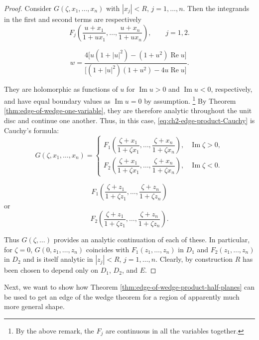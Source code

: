 \begin{proof}
Consider $G(\zeta,x_1,\ldots,x_n)$ with $|x_j|<R$, $j=1,\ldots,n$.
Then the integrands in the first and second terms are respectively
\begin{equation}
  F_j\!\left(\frac{u+x_1}{1+ux_1},\ldots,
              \frac{u+x_n}{1+ux_n}\right),
  \qquad j=1,2.
  \tag{2-102}\label{eq:ch2-edge-product-integrands}
\end{equation}

\[
  w=\frac{4\bigl[u(1+|u|^2)-(1+u^2)\operatorname{Re}u\bigr]}
          {\bigl[(1+|u|^2)(1+u^2)-4u\operatorname{Re}u\bigr]}.
\]



They are holomorphic as functions of $u$ for $\operatorname{Im}u>0$ and
$\operatorname{Im}u<0$, respectively, and have equal boundary values as
$\operatorname{Im}u=0$ by assumption.\begingroup
\renewcommand{\thefootnote}{\ensuremath{\dagger}}
\footnote{By the above remark, the $F_j$ are continuous in all the
variables together.}
\endgroup
By Theorem \ref{thm:edge-of-wedge-one-variable}, they
are therefore analytic throughout the unit disc and continue one another.
Thus, in this case, \eqref{eq:ch2-edge-product-Cauchy} is Cauchy's formula:
\begin{equation}
  G(\zeta,x_1,\ldots,x_n)=
  \begin{cases}
    F_1\!\left(\dfrac{\zeta+x_1}{1+\zeta x_1},\ldots,
                \dfrac{\zeta+x_n}{1+\zeta x_n}\right),
      &\operatorname{Im}\zeta>0,\\[12pt]
    F_2\!\left(\dfrac{\zeta+x_1}{1+\zeta x_1},\ldots,
                \dfrac{\zeta+x_n}{1+\zeta x_n}\right),
      &\operatorname{Im}\zeta<0.
  \end{cases}
  \tag{2-103}\label{eq:ch2-edge-product-Cauchy-formula}
\end{equation}

\[
  F_1\!\left(\frac{\zeta+z_1}{1+\zeta z_1},\ldots,
             \frac{\zeta+z_n}{1+\zeta z_n}\right)
\]
or
\[
  F_2\!\left(\frac{\zeta+z_1}{1+\zeta z_1},\ldots,
             \frac{\zeta+z_n}{1+\zeta z_n}\right).
\]

Thus $G(\zeta,\ldots)$ provides an analytic continuation of each of these.
In particular, for $\zeta=0$, $G(0,z_1,\ldots,z_n)$ coincides with
$F_1(z_1,\ldots,z_n)$ in $D_1$ and $F_2(z_1,\ldots,z_n)$ in $D_2$ and is
itself analytic in $|z_j|<R$, $j=1,\ldots,n$. Clearly, by construction $R$
has been chosen to depend only on $D_1$, $D_2$, and $E$.
\end{proof}

Next, we want to show how Theorem \ref{thm:edge-of-wedge-product-half-planes} can be used to get an edge of the
wedge theorem for a region of apparently much more general shape.

